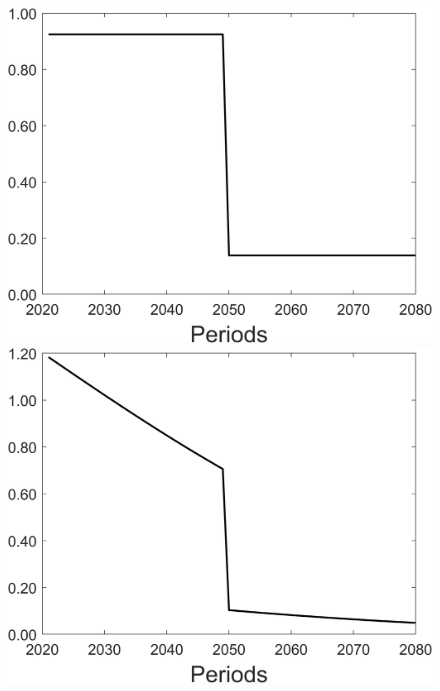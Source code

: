 \begin{figure}[h!!]
\begin{minipage}[]{0.32\textwidth}
	\end{minipage}
	\begin{minipage}[]{0.32\textwidth}
		\includegraphics[width=1\textwidth]{../../codding_model/Own/figures/Rep_agent/staticonlyRam_separate_yd_periods59_eppsilon0.40_zeta1.40_Ad08_Ac04_thetac0.70_thetad0.56_HetGrowth1_tauul0.181_util0_withtarget1_lgd0.png}
	\end{minipage}
	\begin{minipage}[]{0.32\textwidth}
		\includegraphics[width=1\textwidth]{../../codding_model/Own/figures/Rep_agent/staticonlyRam_separate_xd_periods59_eppsilon0.40_zeta1.40_Ad08_Ac04_thetac0.70_thetad0.56_HetGrowth1_tauul0.181_util0_withtarget1_lgd0.png}

\end{minipage}
\end{figure}
